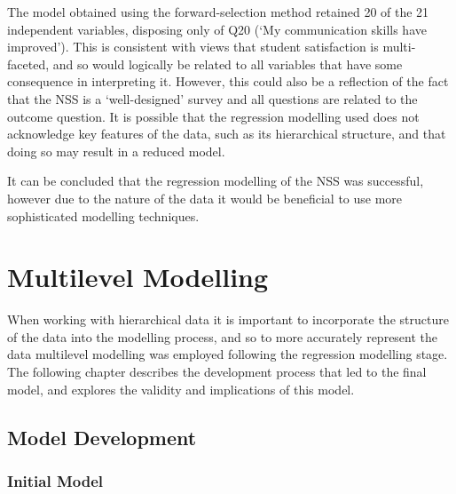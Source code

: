 \documentclass[11pt,a4paper]{report}
\begin{document}
The model obtained using the forward-selection method retained 20 of the 21 independent variables, disposing only of Q20 (`My communication skills have improved'). This is consistent with views that student satisfaction is multi-faceted, and so would logically be related to all variables that have some consequence in interpreting it. However, this could also be a reflection of the fact that the NSS is a `well-designed' survey and all questions are related to the outcome question. It is possible that the regression modelling used does not acknowledge key features of the data, such as its hierarchical structure, and that doing so may result in a reduced model.

It can be concluded that the regression modelling of the NSS was successful, however due to the nature of the data it would be beneficial to use more sophisticated modelling techniques. 
\newpage

\chapter{Multilevel Modelling}
When working with hierarchical data it is important to incorporate the structure of the data into the modelling process, and so to more accurately represent the data multilevel modelling was employed following the regression modelling stage. The following chapter describes the development process that led to the final model, and explores the validity and implications of this model. 

\section{Model Development}
\subsection{Initial Model}
\end{document}
